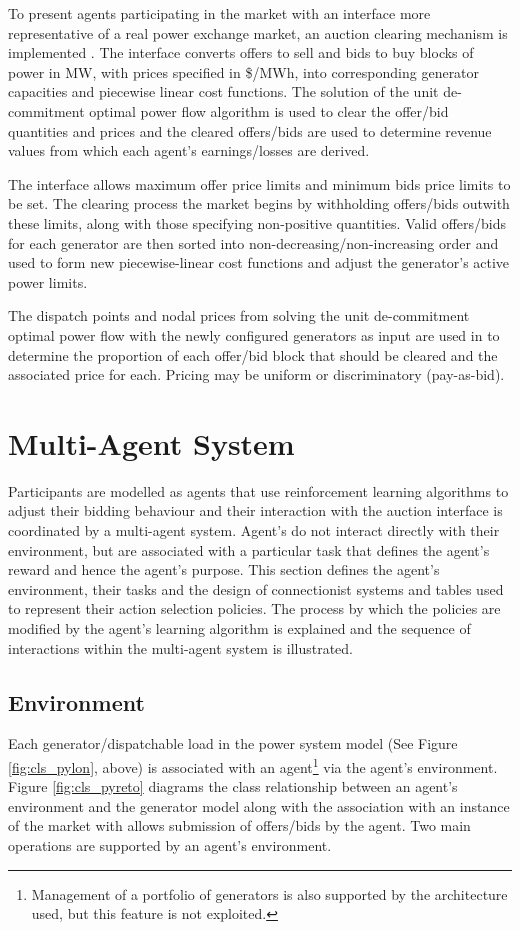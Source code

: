 To present agents participating in the market with an interface more
representative of a real power exchange market, an auction clearing
mechanism is implemented \cite[p.92]{pserc:mp_manual}.  The interface
converts offers to sell and bids to buy blocks of power in MW, with prices
specified in \$/MWh, into corresponding generator capacities and piecewise
linear cost functions.  The solution of the unit de-commitment optimal power
flow algorithm is used to clear the offer/bid quantities and prices and the
cleared offers/bids are used to determine revenue values from which each
agent's earnings/losses are derived.

The interface allows maximum offer price limits and minimum bids price limits
to be set.  The clearing process the market begins by withholding offers/bids
outwith these limits, along with those specifying non-positive quantities.
Valid offers/bids for each generator are then sorted into
non-decreasing/non-increasing order and used to form new piecewise-linear cost
functions and adjust the generator's active power limits.

The dispatch points and nodal prices from solving the unit de-commitment
optimal power flow with the newly configured generators as input are used in
to determine the proportion of each offer/bid block that should be
cleared and the associated price for each.  Pricing may be uniform or
discriminatory (pay-as-bid).

\section{Multi-Agent System}
\label{sec:mas}
Participants are modelled as agents that use reinforcement learning algorithms
to adjust their bidding behaviour and their interaction with the auction
interface is coordinated by a multi-agent system.  Agent's do not interact
directly with their environment, but are associated with a particular task
that defines the agent's reward and hence the agent's purpose.  This section
defines the agent's environment, their tasks and the design of connectionist
systems and tables used to represent their action selection policies.  The
process by which the policies are modified by the agent's learning algorithm is
explained and the sequence of interactions within the multi-agent system is
illustrated.

\subsection{Environment}
Each generator/dispatchable load in the power system model (See Figure
\ref{fig:cls_pylon}, above) is associated with an agent\footnote{Management of
a portfolio of generators is also supported by the architecture used, but this
feature is not exploited.} via the agent's environment.  Figure
\ref{fig:cls_pyreto} diagrams the class relationship between an agent's
environment and the generator model along with the association with an instance
of the market with allows submission of offers/bids by the agent. Two main
operations are supported by an agent's environment.

